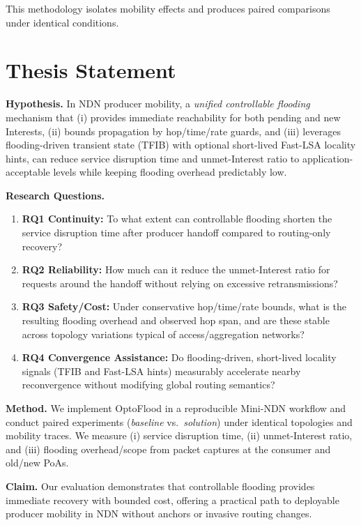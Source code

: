 This methodology isolates mobility effects and produces paired comparisons under identical conditions.


\section{Thesis Statement}
\label{c:introduction:thesis_statement}

\textbf{Hypothesis.} In NDN producer mobility, a \emph{unified controllable flooding} mechanism that (i) provides immediate reachability for both pending and new Interests, (ii) bounds propagation by hop/time/rate guards, and (iii) leverages flooding-driven transient state (TFIB) with optional short-lived Fast-LSA locality hints, can reduce service disruption time and unmet-Interest ratio to application-acceptable levels while keeping flooding overhead predictably low.

\textbf{Research Questions.}
\begin{enumerate}
  \item \textbf{RQ1 Continuity:} To what extent can controllable flooding shorten the service disruption time after producer handoff compared to routing-only recovery?
  \item \textbf{RQ2 Reliability:} How much can it reduce the unmet-Interest ratio for requests around the handoff without relying on excessive retransmissions?
  \item \textbf{RQ3 Safety/Cost:} Under conservative hop/time/rate bounds, what is the resulting flooding overhead and observed hop span, and are these stable across topology variations typical of access/aggregation networks?
  \item \textbf{RQ4 Convergence Assistance:} Do flooding-driven, short-lived locality signals (TFIB and Fast-LSA hints) measurably accelerate nearby reconvergence without modifying global routing semantics?
\end{enumerate}

\textbf{Method.} We implement OptoFlood in a reproducible Mini-NDN workflow and conduct paired experiments (\emph{baseline} vs.\ \emph{solution}) under identical topologies and mobility traces. We measure (i) service disruption time, (ii) unmet-Interest ratio, and (iii) flooding overhead/scope from packet captures at the consumer and old/new PoAs.

\textbf{Claim.} Our evaluation demonstrates that controllable flooding provides immediate recovery with bounded cost, offering a practical path to deployable producer mobility in NDN without anchors or invasive routing changes.

